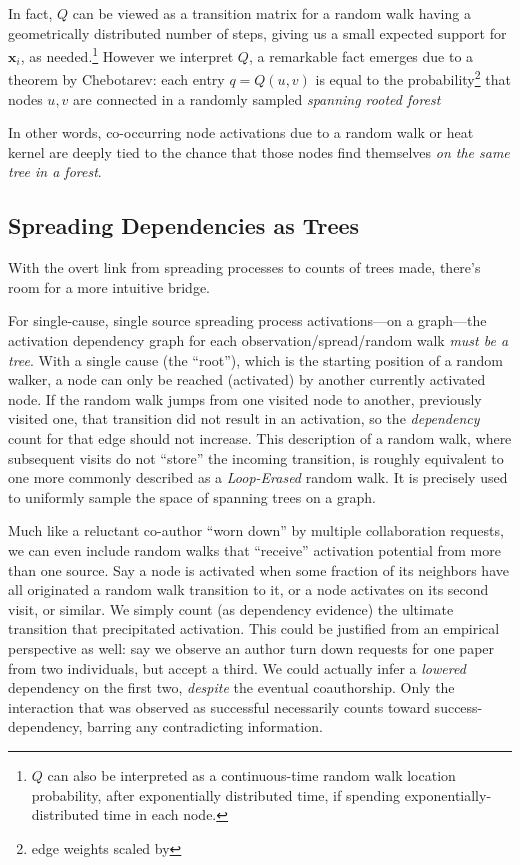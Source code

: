 \documentclass[%
	12pt,
		oneside,
		letterpaper
]{book}
\begin{document}
In fact, \(Q\) can be viewed as a transition matrix for a random walk
having a geometrically distributed number of steps, giving us a small
expected support for \(\mathbf{x}_i\), as needed.\footnote{\(Q\) can
  also be interpreted as a continuous-time random walk location
  probability, after exponentially distributed time, if spending
  exponentially-distributed time in each node.} However we interpret
\(Q\), a remarkable fact emerges due to a theorem by
Chebotarev\autocite{MatrixForestTheorem_Chebotarev2006,Countingrootedforests_Knill2013}:
each entry \(q=Q(u,v)\) is equal to the probability\footnote{edge
  weights scaled by \beta} that nodes \(u,v\) are connected in a
randomly sampled \emph{spanning rooted forest}

In other words, co-occurring node activations due to a random walk or
heat kernel are deeply tied to the chance that those nodes find
themselves \emph{on the same tree in a forest}.

\subsection{Spreading Dependencies as
Trees}\label{spreading-dependencies-as-trees}

With the overt link from spreading processes to counts of trees made,
there's room for a more intuitive bridge.

For single-cause, single source spreading process activations---on a
graph---the activation dependency graph for each
observation/spread/random walk \emph{must be a tree}. With a single
cause (the ``root''), which is the starting position of a random walker,
a node can only be reached (activated) by another currently activated
node. If the random walk jumps from one visited node to another,
previously visited one, that transition did not result in an activation,
so the \emph{dependency} count for that edge should not increase. This
description of a random walk, where subsequent visits do not ``store''
the incoming transition, is roughly equivalent to one more commonly
described as a \emph{Loop-Erased} random walk. It is precisely used to
uniformly sample the space of spanning trees on a
graph.\autocite{Generatingrandomspanning_Wilson1996}

Much like a reluctant co-author ``worn down'' by multiple collaboration
requests, we can even include random walks that ``receive'' activation
potential from more than one source. Say a node is activated when some
fraction of its neighbors have all originated a random walk transition
to it, or a node activates on its second visit, or similar. We simply
count (as dependency evidence) the ultimate transition that precipitated
activation. This could be justified from an empirical perspective as
well: say we observe an author turn down requests for one paper from two
individuals, but accept a third. We could actually infer a
\emph{lowered} dependency on the first two, \emph{despite} the eventual
coauthorship. Only the interaction that was observed as successful
necessarily counts toward success-dependency, barring any contradicting
information.
\end{document}
